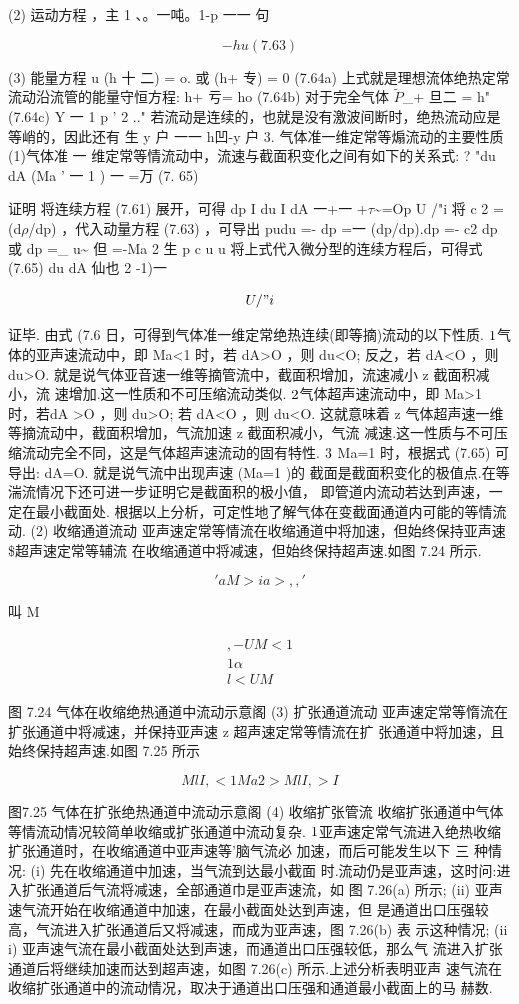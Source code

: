 (2) 运动方程 ，主 1 、。一吨。1-p 一一 句

\[-hu (7. 63)\]

(3) 能量方程 u  (h 十 二) = o. 或  (h+ 专) = 0 (7.64a) 上式就是理想流体绝热定常流动沿流管的能量守恒方程: h+ 亏= ho (7.64b) 对于完全气体 $\tilde{P}$\_+ 旦二 = h" (7.64c) Y 一 1 p ' 2 .." 若流动是连续的，也就是没有激波间断时，绝热流动应是等峭的，因此还有 生 y 户 一一 h凹-y 户 3. 气体准一维定常等煽流动的主要性质 (1)气体准 一 维定常等情流动中，流速与截面积变化之间有如下的关系式: ? "du dA (Ma ' 一 1 ) 一 =万 (7. 65)

证明 将连续方程 (7.61) 展开，可得 dp I du I dA 一+一 +$\tau$\textasciitilde{}=Op U /"i 将 c 2 =(d$\rho$/dp) ，代入动量方程 (7.63) ，可导出 pudu =- dp =一 (dp/dp).dp =- c2 dp 或 dp =\_ u\textasciitilde{} 但 =-Ma 2 生 p c u u 将上式代入微分型的连续方程后，可得式 (7.65) du dA 仙也 2 -1)一

\[U /"i\]

证毕. 由式 (7.6 日，可得到气体准一维定常绝热连续(即等摘)流动的以下性质. ${\rm 1}$气体的亚声速流动中，即 Ma<1 时，若 dA>O ，则 du<O; 反之，若 dA<O ，则 du>O. 就是说气体亚音速一维等摘管流中，截面积增加，流速减小 z 截面积减小，流 速增加.这一性质和不可压缩流动类似. ${\rm 2}$气体超声速流动中，即 Ma>1 时，若dA >O ，则 du>O; 若 dA<O ，则 du<O. 这就意味着 z 气体超声速一维等摘流动中，截面积增加，气流加速 z 截面积减小，气流 减速.这一性质与不可压缩流动完全不同，这是气体超声速流动的固有特性. ${\rm 3}$ Ma=1 时，根据式 (7.65) 可导出: dA=O. 就是说气流中出现声速 (Ma=1 )的 截面是截面积变化的极值点.在等湍流情况下还可进一步证明它是截面积的极小值， 即管道内流动若达到声速，一定在最小截面处. 根据以上分析，可定性地了解气体在变截面通道内可能的等情流动. (2) 收缩通道流动 亚声速定常等情流在收缩通道中将加速，但始终保持亚声速\$超声速定常等辅流 在收缩通道中将减速，但始终保持超声速.如图 7.24 所示.

\['a M >i a >, ,'\]

叫 M

\begin{gather*}
,-U M <1\\
1\alpha \\
l <U M
\end{gather*}

图 7.24 气体在收缩绝热通道中流动示意阁 (3) 扩张通道流动 亚声速定常等惰流在扩张通道中将减速，并保持亚声速 z 超声速定常等情流在扩 张通道中将加速，且始终保持超声速.如图 7.25 所示

\[MlI, <1 Ma2>MlI, >I\]

图7.25 气体在扩张绝热通道中流动示意阁 (4) 收缩扩张管流 收缩扩张通道中气体等情流动情况较简单收缩或扩张通道中流动复杂. ${\rm 1}$亚声速定常气流进入绝热收缩扩张通道时，在收缩通道中亚声速等'脑气流必 加速，而后可能发生以下 三 种情况: (i) 先在收缩通道中加速，当气流到达最小截面 时.流动仍是亚声速，这时问:进入扩张通道后气流将减速，全部通道巾是亚声速流，如 图 7.26(a) 所示; (ii) 亚声速气流开始在收缩通道中加速，在最小截面处达到声速，但 是通道出口压强较高，气流进入扩张通道后又将减速，而成为亚声速，图 7.26(b) 表 示这种情况; (ii i) 亚声速气流在最小截面处达到声速，而通道出口压强较低，那么气 流进入扩张通道后将继续加速而达到超声速，如图 7.26(c) 所示.上述分析表明亚声 速气流在收缩扩张通道中的流动情况，取决于通道出口压强和通道最小截面上的马 赫数.

